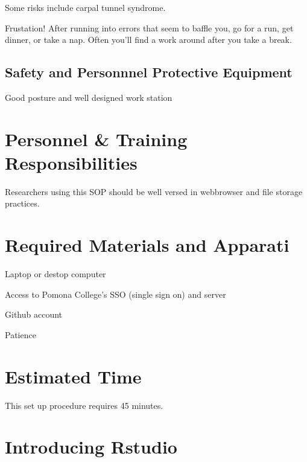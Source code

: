 \documentclass[12pt]{../SOP4_alpha}
\begin{document}
\NP Some risks include carpal tunnel syndrome.

\NP Frustation!  After running into errors that seem to baffle you, go for a run, get dinner, or take a nap. Often you'll find a work around after you take a break. 


\subsection*{Safety and Personnnel Protective Equipment}

\NP Good posture and well designed work station

\section{Personnel \& Training Responsibilities}

\NP Researchers using this SOP should be well versed in webbrowser and file storage practices. 


\section{Required Materials and Apparati}

\NP Laptop or destop computer

\NP Access to Pomona College's SSO (single sign on) and server

\NP Github account

\NP Patience


\section{Estimated Time}

\NP This set up procedure requires 45 minutes.


\section{Introducing Rstudio}
\end{document}
